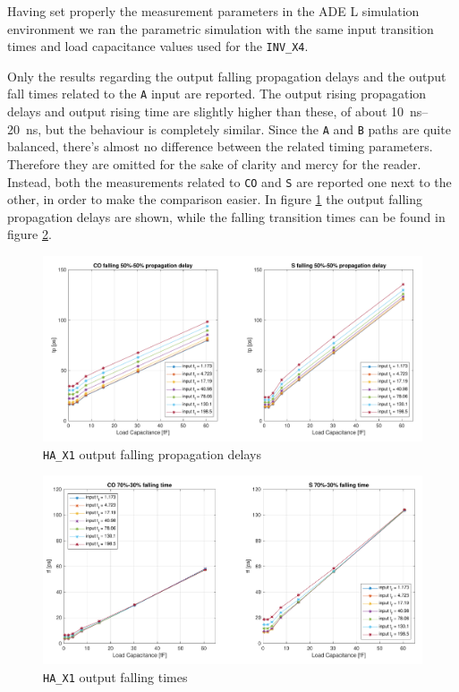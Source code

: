 \documentclass[a4paper]{article}
\newcommand{\inv}{\texttt{INV\_X4}\xspace}
\newcommand{\ha}{\texttt{HA\_X1}\xspace}
\begin{document}
Having set properly the measurement parameters in the ADE L simulation environment we ran the parametric simulation with the same input transition times and load capacitance values used for the \inv.

Only the results regarding the output falling propagation delays and the output fall times related to the \texttt{A} input are reported. The output rising propagation delays and output rising time are slightly higher than these, of about \SIrange{10}{20}{\nano\second}, but the behaviour is completely similar. Since the \texttt{A} and \texttt{B} paths are quite balanced, there's almost no difference between the related timing parameters. Therefore they are omitted for the sake of clarity and mercy for the reader. Instead, both the measurements related to \texttt{CO} and \texttt{S} are reported one next to the other, in order to make the comparison easier. In figure \ref{fig:HA_tp_L} the output falling propagation delays are shown, while the falling transition times can be found in figure \ref{fig:HA_t_F}.

\begin{figure}[ht]
	\centering
	\includegraphics[width=\linewidth]{Images/HA/tp_L_crop.pdf}
	\caption{\ha output falling propagation delays}
	\label{fig:HA_tp_L}
\end{figure}

\begin{figure}[ht]
	\centering
	\includegraphics[width=\linewidth]{Images/HA/t_F_crop.pdf}
	\caption{\ha output falling times}
	\label{fig:HA_t_F}
\end{figure}
\end{document}
